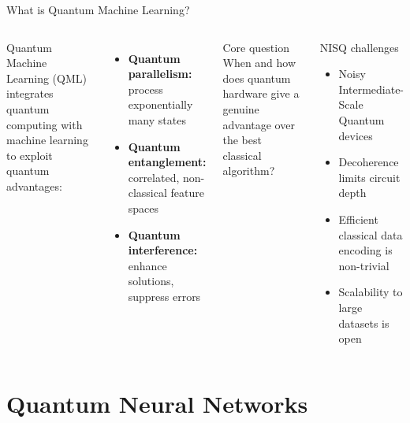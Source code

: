 \documentclass[aspectratio=169,10pt]{beamer}
\begin{document}
\begin{frame}{What is Quantum Machine Learning?}
  \begin{columns}[T]
      Quantum Machine Learning (QML) integrates quantum computing with
      machine learning to exploit quantum advantages:
      \begin{itemize}
        \item \textbf{Quantum parallelism:} process exponentially many states
        \item \textbf{Quantum entanglement:} correlated, non-classical feature spaces
        \item \textbf{Quantum interference:} enhance solutions, suppress errors
      \end{itemize}
      \vspace{0.3cm}
      \begin{alertblock}{Core question}
        When and how does quantum hardware give a genuine advantage
        over the best classical algorithm?
      \end{alertblock}
      \begin{block}{NISQ challenges}
        \begin{itemize}
          \item Noisy Intermediate-Scale Quantum devices
          \item Decoherence limits circuit depth
          \item Efficient classical data encoding is non-trivial
          \item Scalability to large datasets is open
        \end{itemize}
      \end{block}
  \end{columns}
\end{frame}

\section{Quantum Neural Networks}
\end{document}
